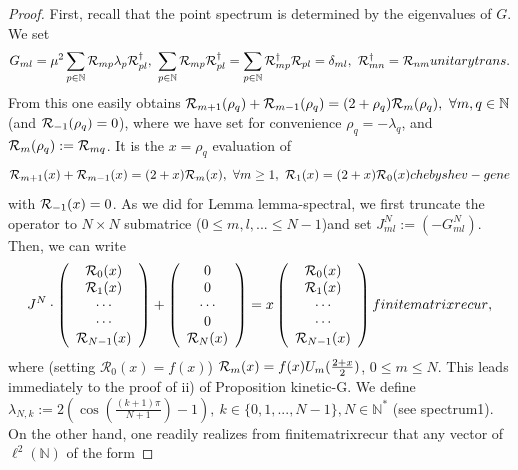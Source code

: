 \documentclass[10pt]{book}
\theoremstyle{break}
\begin{document}
\begin{proof}
First, recall that the point spectrum is determined by the eigenvalues of $G$. We set 
\begin{equation}
G_{ml}=\mu^2\sum_{p\in\mathbb{N}}{\cal{R}}_{mp}\lambda_p{\cal{R}}^\dag_{pl},\ \sum_{p\in\mathbb{N}}{\cal{R}}_{mp}{\cal{R}}^\dag_{pl}=\sum_{p\in\mathbb{N}}{\cal{R}}^\dag_{mp}{\cal{R}}_{pl}=\delta_{ml},\ {\cal{R}}^\dag_{mn}={\cal{R}}_{nm}{unitarytrans}.
\end{equation}
From this one easily obtains ${\cal{R}}_{m+1}(\rho_q)+{\cal{R}}_{m-1}(\rho_q)=(2+\rho_q){\cal{R}}_{m}(\rho_q),\ \forall m,q\in\mathbb{N}$ (and ${\cal{R}}_{-1}(\rho_q)=0$), where we have set for convenience $\rho_q=-\lambda_q$, and ${\cal{R}}_{m}(\rho_q):={\cal{R}}_{mq}$. It is the $x=\rho_q$ evaluation of
\begin{equation}
{\cal{R}}_{m+1}(x)+{\cal{R}}_{m-1}(x)=(2+x){\cal{R}}_{m}(x),\ \forall m\ge1,\ {\cal{R}}_1(x)=(2+x){\cal{R}}_0(x) {chebyshev-gene}
\end{equation}
with ${\cal{R}}_{-1}(x)=0$. As we did for Lemma {lemma-spectral}, we first truncate the operator to $N\times N$ submatrice ($0\le m,l,...\le N-1$)and set $J^N_{ml}:=(-G^N_{ml})$. Then, we can write 
\begin{equation}
J^N\cdot \left(\begin{array}{c}
\mathcal{R}_0(x)\\
\mathcal{R}_1(x)\\ 
\cdots \\
\cdots \\
\mathcal{R}_{N-1}(x)
  \end{array}  \right) + \left(\begin{array}{c}
 0\\
0\\
\cdots \\ 
0 \\
{\cal{R}}_N(x)
  \end{array}  \right)=x\left(\begin{array}{c}
\mathcal{R}_0(x)\\
\mathcal{R}_1(x)\\ 
\cdots \\
\cdots \\
\mathcal{R}_{N-1}(x)
  \end{array}  \right){finitematrixrecur},
\end{equation}
where (setting $\mathcal{R}_0(x)=f(x)$) ${\cal{R}}_m(x)=f(x)U_m({\frac{2+x}{2}})$, $0\le m\le N$. This leads immediately to the proof of ii) of Proposition {kinetic-G}. We define $\lambda_{N,k}:=2\left(\cos({\frac{(k+1)\pi}{N+1}})-1\right), \ k\in\{0,1,...,N-1\}, N\in\mathbb{N}^*$ (see {spectrum1}). On the other hand, one readily realizes from {finitematrixrecur} that any vector of $\ell^2(\mathbb{N})$ of the form 

\end{proof}
\end{document}

